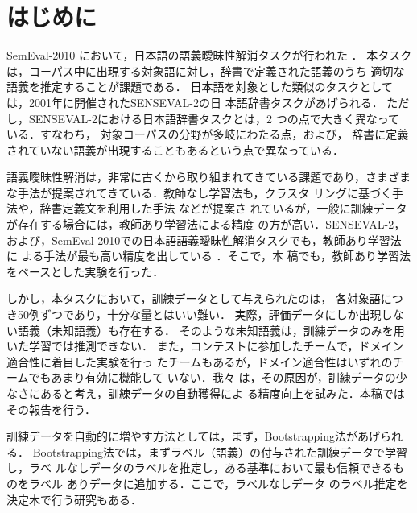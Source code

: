 \documentclass[japanese]{jnlp_1.4}
\begin{document}
\maketitle


\section{はじめに} \label{sec:intro}

SemEval-2010 において，日本語の語義曖昧性解消タスクが行われた
\cite{SemEval2:JWSD}．
本タスクは，コーパス中に出現する対象語に対し，辞書で定義された語義のうち
適切な語義を推定することが課題である．
日本語を対象とした類似のタスクとしては，2001年に開催されたSENSEVAL-2の日
本語辞書タスクがあげられる．
ただし，SENSEVAL-2における日本語辞書タスクとは，2 つの点で大きく異なって
いる．すなわち，
対象コーパスの分野が多岐にわたる点，および，
辞書に定義されていない語義が出現することもあるという点で異なっている．

語義曖昧性解消は，非常に古くから取り組まれてきている課題であり，さまざま
な手法が提案されてきている\cite{Navigli:2009}．教師なし学習法も，クラスタ
リングに基づく手法\cite{Pedersen:2006}や，辞書定義文を利用した手法
\cite{Lesk:1986,Baldwin:Kim:Bond:Fujita:Martinez:Tanaka:2010}などが提案さ
れているが，一般に訓練データが存在する場合には，教師あり学習法による精度
の方が高い\cite{Tanaka:Bond:Baldwin:Fujita:Hashimoto:2007}．SENSEVAL-2，
および，SemEval-2010での日本語語義曖昧性解消タスクでも，教師あり学習法に
よる手法が最も高い精度を出している
\cite{SemEval2:JWSD,Murata:Utiyama:Uchimoto:Ma:Isahara:2003j}．そこで，本
稿でも，教師あり学習法をベースとした実験を行った．


しかし，本タスクにおいて，訓練データとして与えられたのは，
各対象語につき50例ずつであり，十分な量とはいい難い．
実際，評価データにしか出現しない語義（未知語義）も存在する．
そのような未知語義は，訓練データのみを用いた学習では推測できない．
また，コンテストに参加したチームで，ドメイン適合性に着目した実験を行っ
たチームもあるが，ドメイン適合性はいずれのチームでもあまり有効に機能して
いない\cite{Shirai:Nakamura:2010,Fujita:Duh:Fujino:Taira:Shindo:2010}．我々
は，その原因が，訓練データの少なさにあると考え，訓練データの自動獲得によ
る精度向上を試みた．本稿ではその報告を行う．



訓練データを自動的に増やす方法としては，まず，Bootstrapping法があげられる．
Bootstrapping法では，まずラベル（語義）の付与された訓練データで学習し，ラベ
ルなしデータのラベルを推定し，ある基準において最も信頼できるものをラベル
ありデータに追加する\cite{Mihalcea:2002,Mihalcea:2004}．ここで，ラベルなしデータ
のラベル推定を決定木で行う研究もある\cite{Yarowsky:1995}．
\end{document}
